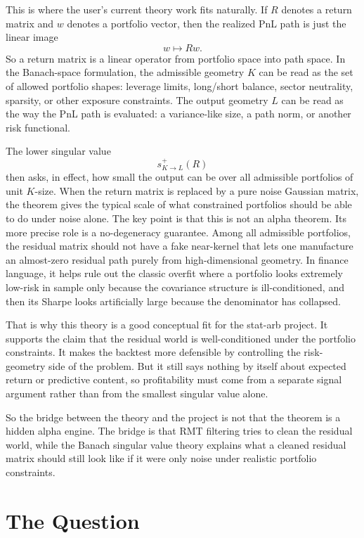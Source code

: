 \documentclass[11pt]{article}
\begin{document}
This is where the user's current theory work fits naturally. If \(R\) denotes a
return matrix and \(w\) denotes a portfolio vector, then the realized PnL path
is just the linear image
\[
w \mapsto Rw.
\]
So a return matrix is a linear operator from portfolio space into path space.
In the Banach-space formulation, the admissible geometry \(K\) can be read as
the set of allowed portfolio shapes: leverage limits, long/short balance,
sector neutrality, sparsity, or other exposure constraints. The output
geometry \(L\) can be read as the way the PnL path is evaluated: a variance-like
size, a path norm, or another risk functional.

The lower singular value
\[
s^+_{K \to L}(R)
\]
then asks, in effect, how small the output can be over all admissible
portfolios of unit \(K\)-size. When the return matrix is replaced by a pure
noise Gaussian matrix, the theorem gives the typical scale of what constrained
portfolios should be able to do under noise alone. The key point is that this
is not an alpha theorem. Its more precise role is a no-degeneracy guarantee.
Among all admissible portfolios, the residual matrix should not have a fake
near-kernel that lets one manufacture an almost-zero residual path purely from
high-dimensional geometry. In finance language, it helps rule out the classic
overfit where a portfolio looks extremely low-risk in sample only because the
covariance structure is ill-conditioned, and then its Sharpe looks artificially
large because the denominator has collapsed.

That is why this theory is a good conceptual fit for the stat-arb project. It
supports the claim that the residual world is well-conditioned under the
portfolio constraints. It makes the backtest more defensible by controlling the
risk-geometry side of the problem. But it still says nothing by itself about
expected return or predictive content, so profitability must come from a
separate signal argument rather than from the smallest singular value alone.

So the bridge between the theory and the project is not that the theorem is a
hidden alpha engine. The bridge is that RMT filtering tries to clean the
residual world, while the Banach singular value theory explains what a cleaned
residual matrix should still look like if it were only noise under realistic
portfolio constraints.

\section*{The Question}
\end{document}

